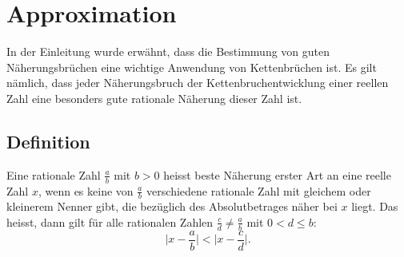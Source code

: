 %
%
%
\section{Approximation
\label{kettenbruch:section:Approximation}}

In der Einleitung wurde erwähnt, dass die Bestimmung von guten
Näherungsbrüchen eine wichtige Anwendung von Kettenbrüchen ist. Es
gilt nämlich, dass jeder Näherungsbruch der Kettenbruchentwicklung
einer reellen Zahl eine besonders gute rationale Näherung dieser
Zahl ist.

\subsection{Definition}

Eine rationale Zahl $\frac{a}{b}$ mit $b>0$ heisst beste Näherung
erster Art an eine reelle Zahl $x$, wenn es keine von $\frac{a}{b}$
verschiedene rationale Zahl mit gleichem oder kleinerem Nenner gibt,
die bezüglich des Absolutbetrages näher bei $x$ liegt.
Das heisst, dann gilt für alle rationalen Zahlen $\frac{c}{d} \ne
\frac{a}{b}$ mit $0<d\le b$:
\begin{equation}
\biggl|x-\frac{a}{b}\biggr| < \biggl| x-\frac{c}{d}\biggr|.
\end{equation}

